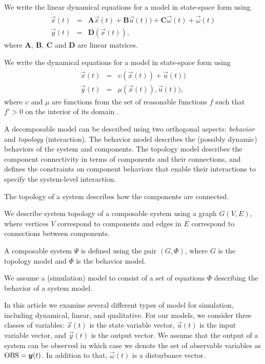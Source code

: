 \begin{definition}
We write the linear dynamical equations for a model in state-space form using
\begin{eqnarray}\label{linear-model}
\dot{\vec{x}}(t) & = & \mathbf{A} \vec{x}(t) + \mathbf{B} \vec{u}(t)) + \mathbf{C} \vec{\omega}(t) +  \vec{\omega}(t)\\
\vec{y}(t) & = & \mathbf{D} (\vec{x}(t)),
\end{eqnarray}
where $\mathbf{A}, ~ \mathbf{B},~\mathbf{C}$ and $\mathbf{D}$ are linear matrices.
\end{definition}

\begin{definition}
We write the dynamical equations for a model in state-space form using
\begin{eqnarray}\label{qual-model}
\dot{\vec{x}}(t) & = & \upsilon (\vec{x}(t)) + \vec{u}(t))\\
\vec{y}(t) & = & \mu (\vec{x}(t)), \vec{u}(t)),
\end{eqnarray}
where $\upsilon$ and $\mu$ are functions from the set of reasonable
functions $f$ such that $f' > 0$ on the interior of its domain
\citep{kuipers1994composition}.
\end{definition}

A decomposable model can be described using two orthogonal aspects:
\textit{behavior} and \textit{topology} (interaction). The behavior
model describes the (possibly dynamic) behaviors of the system and
components. The topology model describes the component connectivity in
terms of components and their connections, and defines the constraints
on component behaviors that enable their interactions to specify the
system-level interaction.

The topology of a system describes how the components are connected.

\begin{definition}[Topology]
%
We describe system topology of a composable system using a graph $G(V,
E)$, where vertices $V$ correspond to components and edges in $E$
correspond to connections between components.
%
\end{definition}

\begin{definition}
%
A composable system $\Psi$ is defined using the pair $(G,{\Phi})$,
where $G$ is the topology model and ${\Phi}$ is the behavior model.
%
\end{definition}

%
We assume a (simulation) model to consist of a set of equations $\Phi$
describing the behavior of a system model.
\par
In this article we examine several different types of model for
simulation, including dynamical, linear, and qualitative. For our
models, we consider three classes of variables: $\vec{x}(t)$ is the
state variable vector, $\vec{u}(t)$ is the input variable vector, and
$\vec{y}(t)$ is the output vector. We assume that the output of a
system can be observed in which case we denote the set of observable
variables as $\obs = \vec{y}(t)$. In addition to that,
$\vec{\omega}(t)$ is a disturbance vector.



